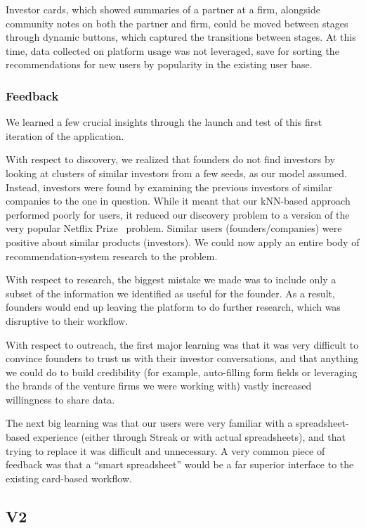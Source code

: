 Investor cards, which showed summaries of a partner at a firm, alongside community notes on both the partner and firm, could be moved between stages through dynamic buttons, which captured the transitions between stages. At this time, data collected on platform usage was not leveraged, save for sorting the recommendations for new users by popularity in the existing user base.

\subsubsection{Feedback}

We learned a few crucial insights through the launch and test of this first iteration of the application.

With respect to discovery, we realized that founders do not find investors by looking at clusters of similar investors from a few seeds, as our model assumed. Instead, investors were found by examining the previous investors of similar companies to the one in question. While it meant that our kNN-based approach performed poorly for users, it reduced our discovery problem to a version of the very popular Netflix Prize~\cite{netflixpize} problem. Similar users (founders/companies) were positive about similar products (investors). We could now apply an entire body of recommendation-system research to the problem.

With respect to research, the biggest mistake we made was to include only a subset of the information we identified as useful for the founder. As a result, founders would end up leaving the platform to do further research, which was disruptive to their workflow.

With respect to outreach, the first major learning was that it was very difficult to convince founders to trust us with their investor conversations, and that anything we could do to build credibility (for example, auto-filling form fields or leveraging the brands of the venture firms we were working with) vastly increased willingness to share data.

The next big learning was that our users were very familiar with a spreadsheet-based experience (either through Streak or with actual spreadsheets), and that trying to replace it was difficult and unnecessary. A very common piece of feedback was that a ``smart spreadsheet'' would be a far superior interface to the existing card-based workflow.

\subsection{V2}


